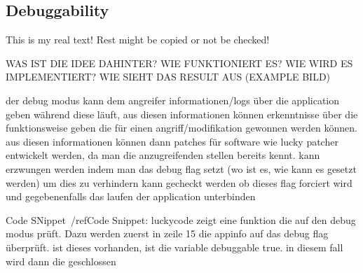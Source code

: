 \subsection{Debuggability} \label{subsection:subsection:counter-tampering-debuggable}
This is my real text! Rest might be copied or not be checked!



WAS IST DIE IDEE DAHINTER? WIE FUNKTIONIERT ES? WIE WIRD ES IMPLEMENTIERT? WIE SIEHT DAS RESULT AUS (EXAMPLE BILD)\newline

der debug modus kann dem angreifer informationen/logs über die application geben während diese läuft, aus diesen informationen können erkenntnisse über die funktionsweise geben die für einen angriff/modifikation gewonnen werden können. aus diesen informationen können dann patches für software wie lucky patcher entwickelt werden, da man die anzugreifenden stellen bereits kennt.
kann erzwungen werden indem man das debug flag setzt (wo ist es, wie kann es gesetzt werden)\newline
um dies zu verhindern kann gecheckt werden ob dieses flag forciert wird und gegebenenfalls das laufen der application unterbinden\newline



 Code SNippet~/ref{Code Snippet: luckycode} zeigt eine funktion die auf den debug modus prüft. Dazu werden zuerst in zeile 15 die appinfo auf das debug flag überprüft. ist dieses vorhanden, ist die variable debuggable true. in diesem fall wird dann die geschlossen\newline
